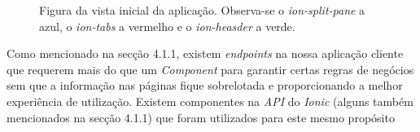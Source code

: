\begin{figure}[h]
	\begin{center}
	\end{center}
	\caption{Figura da vista inicial da aplicação. Observa-se o \textit{ion-split-pane} a azul, o \textit{ion-tabs} a vermelho e o \textit{ion-heasder} a verde.}\label{fig:maincomponent}
\end{figure}
\pagebreak

Como mencionado na secção 4.1.1, existem \textit{endpoints} na nossa aplicação cliente que requerem mais do que um \textit{Component} para garantir certas regras de negócios sem que a informação nas páginas fique sobrelotada e proporcionando a melhor experiência de utilização. Existem componentes na \textit{API} do \textit{Ionic} (alguns também mencionados na secção 4.1.1) que foram utilizados para este mesmo propósito\\

